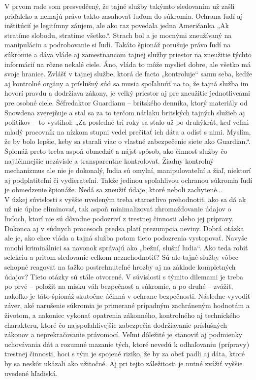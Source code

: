 \documentclass{article}
\begin{document}
\begin{flushleft}
V prvom rade som presvedčený, že tajné služby takýmto sledovaním už zašli priďaleko a nemajú právo takto zasahovať ľuďom do súkromia. Ochrana ľudí aj inštitúcií je legitímny záujem, ale ako raz povedala jedna Američanka „Ak stratíme slobodu, stratíme všetko.“. Strach bol a je mocnými zneužívaný na manipuláciu a podrobovanie si ľudí. Takáto špionáž porušuje právo ľudí na súkromie a dáva vláde aj zamestnancom tajnej služby priestor na zneužitie týchto informácií na rôzne nekalé ciele. Áno, vláda to môže myslieť dobre, ale všetko má svoje hranice. Zvlášť v tajnej službe, ktorá de facto „kontroluje“ samu seba, keďže aj kontrolné orgány a príslušný súd sa musia spoľahnúť na to, že tajná služba im hovorí pravdu a dodržiava zákony, je veľký priestor aj pre zneužitie jednotlivcami pre osobné ciele. Šéfredaktor Guardianu – britského denníka, ktorý materiály od Snowdena zverejňuje a stal sa za to terčom nátlaku britských tajných služieb aj politikov – to vystihol: „Za posledné tri roky sa stalo už po druhýkrát, keď veľmi mladý pracovník na nízkom stupni vedel prečítať ich dáta a odísť s nimi. Myslím, že by bolo lepšie, keby sa starali viac o vlastné zabezpečenie siete ako Guardian.“. Špionáž preto treba aspoň obmedziť a nájsť spôsob, ako činnosť služby čo najúčinnejšie nezávisle a transparentne kontrolovať. Žiadny kontrolný mechanizmus ale nie je dokonalý, ľudia sú omylní, manipulovateľní a žiaľ, niektorí aj podplatiteľní či vydierateľní. Takže jedinou spoľahlivou ochranou súkromia ľudí je obmedzenie špionáže. Nedá sa zneužiť údaje, ktoré neboli zachytené...\\
V úzkej súvislosti s vyššie uvedeným treba starostlivo prehodnotiť, ako sa dá ak už nie úplne eliminovať, tak aspoň minimalizovať zhromažďovanie údajov o ľuďoch, ktorí nie sú dôvodne podozriví z trestnej činnosti alebo jej prípravy. Dokonca aj v súdnych procesoch predsa platí prezumpcia neviny. Dobrá otázka ale je, ako chce vláda a tajná služba potom tieto podozrenia vystopovať. Navyše mnohí kriminálnici sa navonok správajú ako „bežní, slušní ľudia“. Ako teda robiť selekciu a pritom sledovanie celkom neznehodnotiť? Sú ale tajné služby vôbec schopné reagovať na ťažko postrehnuteľné hrozby aj na základe kompletných údajov? Tieto otázky sú stále otvorené. V súvislosti s týmito dilemami je treba po prvé – položiť na misku váh bezpečnosť a súkromie, a po druhé – zvážiť, nakoľko je táto špionáž skutočne účinná v ochrane bezpečnosti. Následne vyvodiť záver, aké narušenie súkromia je primerané prípadným zachráneným hodnotám a životom, a nakoniec vykonať opatrenia zákonného, kontrolného aj technického charakteru, ktoré čo najspoľahlivejšie zabezpečia dodržiavanie príslušných zákonov a neprekračovanie právomocí. Veľmi dôležité je stanoviť aj podmienky uchovávania dát a rozumné mazanie tých, ktoré nevedú k odhaľovaniu (prípravy) trestnej činnosti, hoci s tým je spojené riziko, že by za obeť padli aj dáta, ktoré by sa neskôr ukázali ako užitočné. Aj pri tejto záležitosti je nutné zvážiť vyššie uvedené hľadiská.\\

\end{flushleft}
\end{document}
